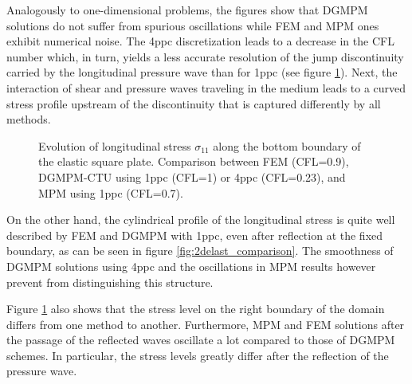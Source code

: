 Analogously to one-dimensional problems, the figures show that DGMPM solutions do not suffer from spurious oscillations while FEM and MPM ones exhibit numerical noise.
The 4ppc discretization leads to a decrease in the CFL number which, in turn, yields a less accurate resolution of the jump discontinuity carried by the longitudinal pressure wave than for 1ppc (see figure \ref{fig:elastlines}).
Next, the interaction of shear and pressure waves traveling in the medium leads to a curved stress profile upstream of the discontinuity that is captured differently by all methods.  
\begin{figure}[h!]
  { \label{subfig:line_elast1}}
  { \label{subfig:line_elast2}}
  
  \caption{Evolution of longitudinal stress $\sigma_{11}$ along the bottom boundary of the elastic square plate. Comparison between FEM (CFL=0.9), DGMPM-CTU using 1ppc (CFL=1) or 4ppc (CFL=0.23), and MPM using 1ppc (CFL=0.7).}
  \label{fig:elastlines}
\end{figure}
On the other hand, the cylindrical profile of the longitudinal stress is quite well described by FEM and DGMPM with 1ppc, even after reflection at the fixed boundary, as can be seen in figure \ref{fig:2delast_comparison}.
The smoothness of DGMPM solutions using 4ppc and the oscillations in MPM results however prevent from distinguishing this structure.

Figure \ref{fig:elastlines} also shows that the stress level on the right boundary of the domain differs from one method to another. Furthermore, MPM and FEM solutions after the passage of the reflected waves oscillate a lot compared to those of DGMPM schemes.
In particular, the stress levels greatly differ after the reflection of the pressure wave.


